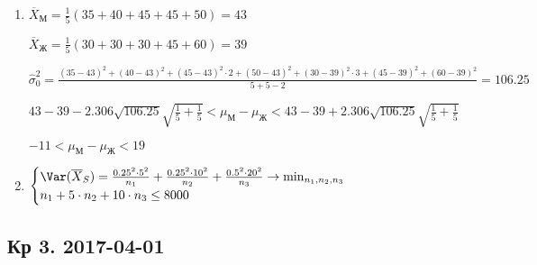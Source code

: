 \begin{enumerate}
\item  $\overline{X}_{\text{М}} = \frac{1}{5} \left(35 + 40 + 45 + 45 + 50\right) = 43$

$\overline{X}_{\text{Ж}} = \frac{1}{5} \left(30 + 30 + 30 + 45 + 60 \right) =39$

$\hat{\sigma}_0^2 = \frac{(35-43)^2 + (40-43)^2 + (45-43)^2 \cdot 2 + (50-43)^2 + (30-39)^2 \cdot 3 +(45-39)^2 + (60-39)^2 }{5 + 5 - 2} = 106.25$

$43 - 39 - 2.306 \sqrt{106.25} \sqrt{\frac{1}{5}+\frac{1}{5}} < \mu_{\text{М}} - \mu_{\text{Ж}} < 43 - 39 + 2.306 \sqrt{106.25} \sqrt{\frac{1}{5}+\frac{1}{5}} $

$ -11 <   \mu_{\text{М}} - \mu_{\text{Ж}}  < 19$

\item
$
\begin{cases}
\Var(\overline{X}_S) = \frac{0.25^2\cdot 5^2}{n_1} + \frac{0.25^2 \cdot 10^2}{n_2} + \frac{0.5^2 \cdot 20^2}{n_3} \to \min_{n_1, n_2, n_3} \\
n_1 + 5 \cdot n_2 + 10 \cdot n_3 \leq 8000
\end{cases}
$
\end{enumerate}



\subsection{Кр 3. 2017-04-01}

